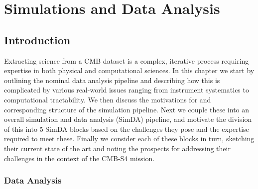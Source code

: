  
\chapter{Simulations and Data Analysis}
\renewcommand*\thesection{\arabic{section}}


\section{Introduction}

Extracting science from a CMB dataset is a complex, iterative process requiring expertise in both physical and computational sciences. In this chapter we start by outlining the nominal data analysis pipeline and describing how this is complicated by various real-world issues ranging from instrument systematics to computational tractability. We then discuss the motivations for and corresponding structure of the simulation pipeline. Next we couple these into an overall simulation and data analysis (SimDA) pipeline, and motivate the division of this into 5 SimDA blocks based on the challenges they pose and the expertise required to meet these. Finally we consider each of these blocks in turn, sketching their current state of the art and noting the prospects for addressing their challenges in the context of the CMB-S4 mission.

\subsection{Data Analysis}

